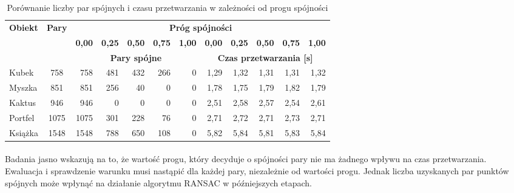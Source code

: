 \documentclass[../main.tex]{subfiles}
\begin{document}
    \begin{table}[H]
    \caption{Porównanie liczby par spójnych i czasu przetwarzania w zależności od progu spójności}
     \label{t:consistency_threshold}
     \begin{center}
        \begin{tabular}{|l|c|r|r|r|r|r||r|r|r|r|r|}
            \hline
            \multirow{3}{*}{\textbf{Obiekt}} &
            \multirow{3}{*}{\textbf{Pary}} & 
            \multicolumn{10}{c|}{\textbf{Próg spójności}} \\
            \cline{3-12} & {} &
            \textbf{0,00} & \textbf{0,25} & \textbf{0,50} & \textbf{0,75} & \textbf{1,00} &
            \textbf{0,00} & \textbf{0,25} & \textbf{0,50} & \textbf{0,75} & \textbf{1,00} \\
            \cline{3-12} & {} &
            \multicolumn{5}{c||}{\textbf{Pary spójne}} & \multicolumn{5}{c|}{\textbf{Czas przetwarzania [s]}}\\
             \hline
             {Kubek} & {758} & {758} & {481} & {432} & {266} & {0} & {1,29} & {1,32} & {1,31} & {1,31} & {1,32} \\
             \hline
             {Myszka} & {851} & {851} & {256} & {40} & {0} & {0} & {1,78} & {1,75} & {1,79} & {1,82} & {1,79} \\
             \hline
             {Kaktus} & {946} & {946} & {0} & {0} & {0} & {0} & {2,51} & {2,58} & {2,57} & {2,54} & {2,61} \\
            \hline
            {Portfel} & {1075} & {1075} & {301} & {228} & {76} & {0} & {2,71} & {2,72} & {2,71} & {2,73} & {2,71} \\
             \hline
             {Książka} & {1548} & {1548} & {788} & {650} & {108} & {0} & {5,82} & {5,84} & {5,81} & {5,83} & {5,84} \\
             \hline 
             
        \end{tabular}
     \end{center}
    \end{table}
    
    \paragraph{}
    Badania jasno wskazują na to, że wartość progu, który decyduje o spójności pary nie ma żadnego wpływu na czas przetwarzania. Ewaluacja i sprawdzenie warunku musi nastąpić dla każdej pary, niezależnie od wartości progu. Jednak liczba uzyskanych par punktów spójnych może wpłynąć na działanie algorytmu RANSAC w późniejszych etapach.
\end{document}
